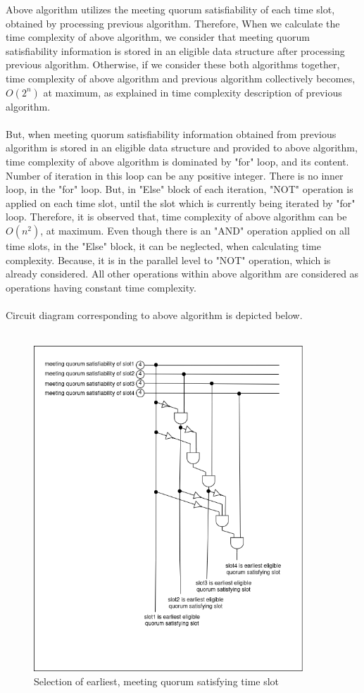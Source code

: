 \documentclass{article}
\begin{document}
Above algorithm utilizes the meeting quorum satisfiability of each time slot, obtained by processing previous algorithm. Therefore, When we calculate the time complexity of above algorithm, we consider that meeting quorum satisfiability information is stored in an eligible data structure after processing previous algorithm. Otherwise, if we consider these both algorithms together, time complexity of above algorithm and previous algorithm collectively becomes, $O(2^{n})$ at maximum, as explained in time complexity description of previous algorithm.\\ \\
But, when meeting quorum satisfiability information obtained from previous algorithm is stored in an eligible data structure and provided to above algorithm, time complexity of above algorithm is dominated by "for" loop, and its content. Number of iteration in this loop can be any positive integer. There is no inner loop, in the "for" loop. But, in "Else" block of each iteration, "NOT" operation is applied on each time slot, until the slot which is currently being iterated by "for" loop. Therefore, it is observed that, time complexity of above algorithm can be $O(n^{2})$, at maximum. Even though there is an "AND" operation applied on all time slots, in the "Else" block, it can be neglected, when calculating time complexity. Because, it is in the parallel level to "NOT" operation, which is already considered. All other operations within above algorithm are considered as operations having constant time complexity.\\ \\
Circuit diagram corresponding to above algorithm is depicted below.\\ \\

\begin{figure}[H]
    \centering
    \includegraphics[width=0.9\textwidth]{./image/circuit_diagram/4_earliest_slot_selection.png}
    \caption{Selection of earliest, meeting quorum satisfying time slot}
    \label{fig:selecting earliest, meeting quorum satisfying time slot}
\end{figure} 
\end{document}
